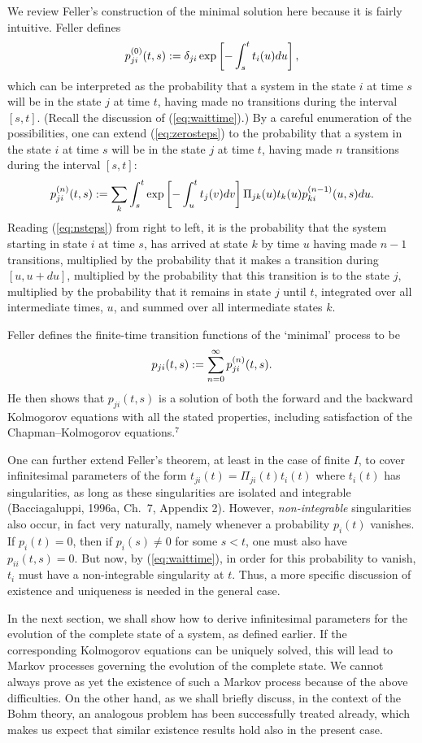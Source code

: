 \documentclass[12pt]{article}
\newcommand{\be}{\vspace*{6pt} \begin{equation}}
\newcommand{\ee}{\vspace*{10pt} \end{equation}}
\begin{document}
We review Feller's construction of the minimal solution here because it
is fairly intuitive.  Feller defines
\be
\label{eq:zerosteps}
p^{(0)}_{ji}(t,s) := \delta_{ji}\exp \left[ { -\int_s^t t_i(u)du }
\right],
\ee
which can be interpreted as the probability that a system in the state 
$i$ at time $s$ will be in the state $j$ at time $t$, having made no 
transitions during the interval $[s,t]$.  (Recall the discussion of 
(\ref{eq:waittime}).) By a careful enumeration of the possibilities, 
one can extend (\ref{eq:zerosteps}) to the probability that a system 
in the state $i$ at time $s$ will be in the state $j$ at time $t$, 
having made $n$ transitions during the interval $[s,t]$:
\be
\label{eq:nsteps}
p^{(n)}_{ji}(t,s) := \sum_k\int_s^t\exp \left[ { -\int_u^t t_j(v)dv}
\right] \Pi_{jk}(u)t_k(u)p^{(n-1)}_{ki}(u,s)du.
\ee
Reading (\ref{eq:nsteps}) from right to left, it is the probability 
that the system starting in state $i$ at time $s$, has arrived at 
state $k$ by time $u$ having made $n-1$ transitions, multiplied by the 
probability that it makes a transition during $[u,u+du]$, multiplied 
by the probability that this transition is to the state $j$, 
multiplied by the probability that it remains in state $j$ until $t$, 
integrated over all intermediate times, $u$, and summed over all 
intermediate states $k$.

Feller defines the finite-time transition functions of the `minimal'
process to be
\be
\label{eq:Fellerdef}
p_{ji}(t,s):=\sum_{n=0}^\infty p^{(n)}_{ji}(t,s).
\ee
He then shows that $p_{ji}(t,s)$ is a solution of both the forward
and the backward Kolmogorov equations with all the stated properties,
including satisfaction of the Chapman--Kolmogorov equations.$^7$

One can further extend Feller's theorem, at least in the case of 
finite $I$, to cover infinitesimal parameters of the form 
$t_{ji}(t)=\Pi_{ji}(t)t_i(t)$ where $t_i(t)$ has singularities, as 
long as these singularities are isolated and integrable 
(Bacciagaluppi, 1996a, Ch.~7, Appendix 2).  However, {\em 
non-integrable} singularities also occur, in fact very naturally, 
namely whenever a probability $p_i(t)$ vanishes.  If $p_i(t)=0$, then 
if $p_i(s)\neq 0$ for some $s<t$, one must also have $p_{ii}(t,s)=0$.  
But now, by (\ref{eq:waittime}), in order for this probability to 
vanish, $t_i$ must have a non-integrable singularity at $t$.  Thus, a 
more specific discussion of existence and uniqueness is needed in the 
general case.

In the next section, we shall show how to derive infinitesimal 
parameters for the evolution of the complete state of a system, as 
defined earlier.  If the corresponding Kolmogorov equations can be 
uniquely solved, this will lead to Markov processes governing the 
evolution of the complete state.  We cannot always prove as yet the 
existence of such a Markov process because of the above difficulties.  
On the other hand, as we shall briefly discuss, in the context of the 
Bohm theory, an analogous problem has been successfully treated 
already, which makes us expect that similar existence results hold 
also in the present case.
\end{document}

